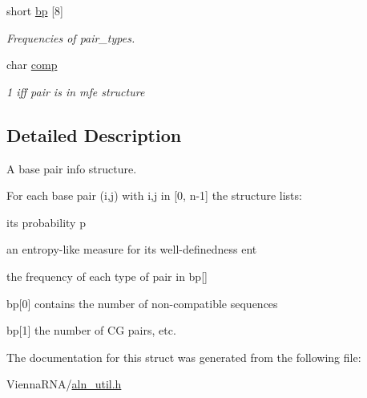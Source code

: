 \begin{DoxyCompactItemize}
\mbox{\label{structvrna__pinfo__s_aa5feac5559b36dcd7cb38111c45d444d}} 
short \mbox{\hyperlink{structvrna__pinfo__s_aa5feac5559b36dcd7cb38111c45d444d}{bp}} \mbox{[}8\mbox{]}
\begin{DoxyCompactList}\small\item\em Frequencies of pair\+\_\+types. \end{DoxyCompactList}\item 
\mbox{\label{structvrna__pinfo__s_a0720ae74ce53802a759ee9f98e9c8c43}} 
char \mbox{\hyperlink{structvrna__pinfo__s_a0720ae74ce53802a759ee9f98e9c8c43}{comp}}
\begin{DoxyCompactList}\small\item\em 1 iff pair is in mfe structure \end{DoxyCompactList}\end{DoxyCompactItemize}


\subsection{Detailed Description}
A base pair info structure. 

For each base pair (i,j) with i,j in \mbox{[}0, n-\/1\mbox{]} the structure lists\+:
\begin{DoxyItemize}
\item its probability \textquotesingle{}p\textquotesingle{}
\item an entropy-\/like measure for its well-\/definedness \textquotesingle{}ent\textquotesingle{}
\item the frequency of each type of pair in \textquotesingle{}bp\mbox{[}\mbox{]}\textquotesingle{}
\begin{DoxyItemize}
\item \textquotesingle{}bp\mbox{[}0\mbox{]}\textquotesingle{} contains the number of non-\/compatible sequences
\item \textquotesingle{}bp\mbox{[}1\mbox{]}\textquotesingle{} the number of CG pairs, etc. 
\end{DoxyItemize}
\end{DoxyItemize}

The documentation for this struct was generated from the following file\+:\begin{DoxyCompactItemize}
\item 
Vienna\+R\+N\+A/\mbox{\hyperlink{aln__util_8h}{aln\+\_\+util.\+h}}\end{DoxyCompactItemize}
